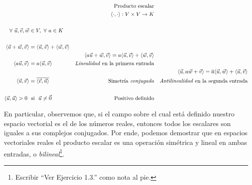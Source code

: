 \documentclass[12pt,dvipsnames]{article}
\numberwithin{equation}{section}
\begin{document}
\begin{align*}
    & &\text{Producto escalar}& &\\
    & &\langle\cdot,\cdot\rangle:V\times V\to K & &\\
    \\
    \forall \ \vec{u}, \vec{v}, \vec{w}&\in V, \ \forall \ a\in K\\
    \\
    \langle\vec{u}+\vec{w},\vec{v}\rangle &= \langle \vec{u} , \vec{v} \rangle + \langle \vec{w} , \vec{v} \rangle \\
                                          & &\langle a\vec{u}+\vec{w} , \vec{v} \rangle = a \langle \vec{u} , \vec{v} \rangle + \langle \vec{w} , \vec{v} \rangle\\
    \langle a\vec{u} , \vec{v} \rangle &= a \langle \vec{u} , \vec{v} \rangle &\text{\emph{Linealidad} en la primera entrada} \\
                                       & & & &\langle \vec{u} , a\vec{w}+\vec{v} \rangle = \overline{a} \langle \vec{u} , \vec{w} \rangle + \langle \vec{u} , \vec{v} \rangle \\
    \langle \vec{u} , \vec{v} \rangle &= \overline{ \langle \vec{v} , \vec{u} \rangle} &\text{Simetría \emph{conjugada}} & &\text{\emph{Antilinealidad} en la segunda entrada}\\
    \\
    \langle \vec{u}, \vec{u} \rangle > 0 \ &\ \text{si} \ \ \vec{u}\neq\vec{0} &\text{Positivo definido}
\end{align*}

\noindent En particular, observemos que, si el campo sobre el cual está definido nuestro espacio vectorial es el de los números reales, entonces todos los escalares son iguales a sus complejos conjugados. Por ende, podemos demostrar que en espacios vectoriales reales el producto escalar es una operación simétrica y lineal en ambas entradas, o \emph{bilineal}\footnote{Escribir ``Ver Ejercicio 1.3.'' como nota al pie.}.
\end{document}
